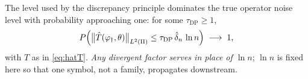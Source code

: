 \begin{assumption}\label{ass:stopfeas}
The level used by the discrepancy principle dominates the true operator noise level with probability
approaching one: for some $\tau_{\mathrm{DP}}\ge1$,
\begin{equation}\label{eq:a7amend}
P\Big(\big\|\hat T(\varphi_{\dagger},\theta)\big\|_{L^2(\Pi)}\le\tau_{\mathrm{DP}}\,\hat\delta_n\,\ln n\Big)
\;\longrightarrow\;1 ,
\end{equation}
with $\hat T$ as in \eqref{eq:hatT}. \emph{Any divergent factor serves in place of $\ln n$}; $\ln n$ is
fixed here so that one symbol, not a family, propagates downstream.
\end{assumption}

%

